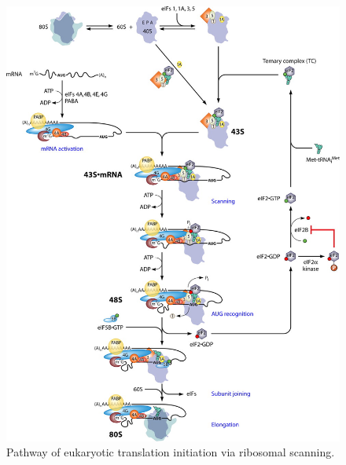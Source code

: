 \documentclass[
  12pt,
  openany]{book}
\begin{document}
\begin{figure}[ht]
\includegraphics{./figures/initiation.jpg} 
  \caption{Pathway of eukaryotic translation initiation via ribosomal scanning.
  \label{fig:initiation}}
\end{figure}

\clearpage
\end{document}
